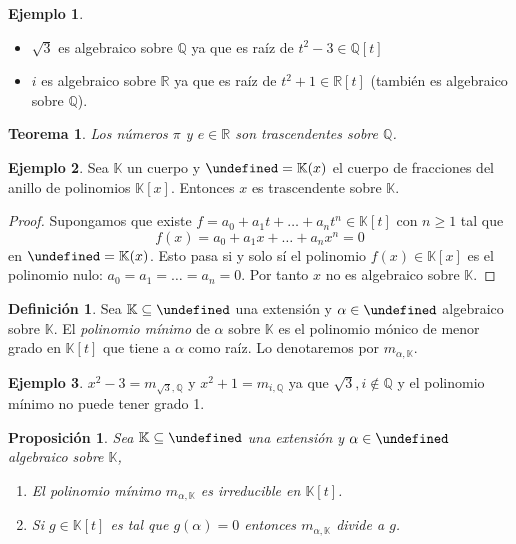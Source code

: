 \documentclass[10pt, spanish]{report}
\newtheorem*{prop}{Proposición}
\newtheorem*{tma}{Teorema}
\theoremstyle{definition}
\newtheorem*{defin}{Definición}
\newtheorem*{ej}{Ejemplo}
\newcommand{\Q}{\mathbb{Q}}
\newcommand{\R}{\mathbb{R}}
\newcommand{\K}{\mathbb{K}}
\let\L\undefined
\newcommand{\L}{\mathbb{L}}
\renewcommand{\geq}{\geqslant}
\begin{document}
\begin{ej}\hspace{0pt}
    \begin{itemize}
        \item $\sqrt{3}$ es algebraico sobre $\Q$ ya que es raíz de $t^2-3\in\Q[t]$
        \item $i$ es algebraico sobre $\R$ ya que es raíz de $t^2+1\in \R[t]$
            (también es algebraico sobre $\Q$).
    \end{itemize}
\end{ej}

\begin{tma}
    Los números $\pi$ y $e\in\R$ son trascendentes sobre $\Q$.
\end{tma}

\begin{ej}
    Sea $\K$ un cuerpo y $\L=\K(x)$ el cuerpo de fracciones del anillo de
    polinomios $\K[x]$. Entonces $x$ es trascendente sobre $\K$.
\end{ej}

\begin{proof}
    Supongamos que existe $f=a_0+a_1t+\ldots+a_nt^n\in\K[t]$ con $n\geq1$ tal
    que \[f(x)=a_0+a_1x+\ldots+a_nx^n=0\] en $\L=\K(x)$. Esto pasa si y solo sí el
    polinomio $f(x)\in\K[x]$ es el polinomio nulo: $a_0=a_1=\ldots=a_n=0$. Por
    tanto $x$ no es algebraico sobre $\K$.
\end{proof}

\begin{defin}
    Sea $\K\subseteq\L$ una extensión y $\alpha\in\L$ algebraico sobre $\K$. El
    \textit{polinomio mínimo} de $\alpha$ sobre $\K$ es el polinomio mónico de
    menor grado en $\K[t]$ que tiene a $\alpha$ como raíz. Lo denotaremos por
    $m_{\alpha,\K}$.
\end{defin}

\begin{ej}
    $x^2-3=m_{\sqrt{3},\Q}$ y $x^2+1=m_{i,\Q}$ ya que $\sqrt{3},i\not\in\Q$ y el
    polinomio mínimo no puede tener grado 1.
\end{ej}

\begin{prop}
    Sea $\K\subseteq\L$ una extensión y $\alpha\in \L$ algebraico sobre $\K$,
    \begin{enumerate}
        \item El polinomio mínimo $m_{\alpha,\K}$ es irreducible en $\K[t]$.
        \item Si $g\in \K[t]$ es tal que $g(\alpha)=0$ entonces $m_{\alpha,\K}$
            divide a $g$.
    \end{enumerate}
\end{prop}
\end{document}
